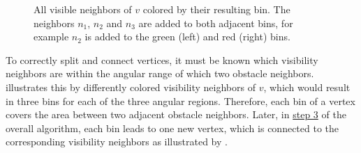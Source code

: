 			\begin{figure}[h]
				\begin{figcenter}
				\end{figcenter}
				\caption[Example of vertices sorted into obstacle neighbor-based bins.]{
					All visible neighbors of $v$ colored by their resulting bin.
					The neighbors $n_1$, $n_2$ and $n_3$ are added to both adjacent bins, for example $n_2$ is added to the green (left) and red (right) bins.
				}
				\label{fig:visibility-bin-sorting}
			\end{figure}
			
			To correctly split and connect vertices, it must be known which visibility neighbors are within the angular range of which two obstacle neighbors.
			 illustrates this by differently colored visibility neighbors of $v$, which would result in three bins for each of the three angular regions.
			Therefore, each bin of a vertex covers the area between two adjacent obstacle neighbors.
			Later, in \hyperref[subsec:step-3-graph-creation]{step 3} of the overall algorithm, each bin leads to one new vertex, which is connected to the corresponding visibility neighbors as illustrated by .
			
